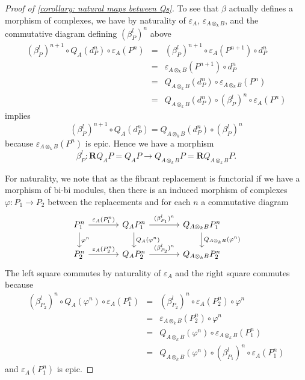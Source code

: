 \begin{proof}[Proof of {\ref{corollary: natural maps between Qs}}]
  To see that \(\beta\) actually defines a morphism of complexes, we have by naturality of \(\varepsilon_A\), \(\varepsilon_{A \otimes_k B}\), and the commutative diagram defining \((\beta^l_P)^n\) above 
  \begin{eqnarray*}
    (\beta^l_P)^{n+1} \circ Q_{A}(d^n_{P}) \circ \varepsilon_{A}(P^n)
    &=& (\beta^l_P)^{n+1} \circ \varepsilon_{A}(P^{n+1}) \circ d^n_{P}\\
    &=& \varepsilon_{A \otimes_k B}(P^{n+1}) \circ d^n_{P}\\
    &=& Q_{A \otimes_k B}(d_{P}^n) \circ \varepsilon_{A \otimes_k B}(P^n)\\
    &=& Q_{A \otimes_k B}(d_{P}^n) \circ (\beta^l_P)^n \circ \varepsilon_{A}(P^n)
  \end{eqnarray*}
  implies
  \[(\beta^l_P)^{n+1} \circ Q_{A}(d^n_{P}) = Q_{A \otimes_k B}(d^n_{P}) \circ (\beta^l_P)^n\]
  because \(\varepsilon_{A \otimes_k B}(P^n)\) is epic. Hence we have a morphism
  \[\beta^l_P \colon \mathbf{R}Q_{A} P = Q_{A} P \to Q_{A \otimes_k B} P = \mathbf{R}Q_{A \otimes_k B} P.\]

  For naturality, we note that as the fibrant replacement is functorial if we have a morphism of bi-bi modules, then there is an induced morphism of complexes \(\varphi \colon P_1 \to P_2\) between the replacements and for each \(n\) a commutative diagram 
  \[\begin{tikzcd}[column sep=large]
  P_1^n \arrow{d}{\varphi^n}\arrow{r}{\varepsilon_{A}(P_1^n)} & Q_{A} P_1^n\arrow{d}{Q_{A}(\varphi^n)} \arrow{r}{(\beta^l_{P_1})^n} & Q_{A \otimes_k B}P_1^n \arrow{d}{Q_{A \otimes_k B}(\varphi^n)}\\
  P_2^n \arrow{r}{\varepsilon_{A}(P_2^n)} & Q_{A} P_2^n \arrow{r}{(\beta^l_{P_2})^n} & Q_{A \otimes_k B} P_2^n
  \end{tikzcd}\]  The left square commutes by naturality of \(\varepsilon_{A}\) and the right square commutes because
  \begin{eqnarray*}
    (\beta^l_{P_2})^n \circ Q_{A}(\varphi^n) \circ \varepsilon_{A}(P_1^n)
    &=& (\beta^l_{P_2})^n \circ \varepsilon_{A}(P_2^n) \circ \varphi^n\\
    &=&  \varepsilon_{A \otimes_k B}(P_2^n) \circ \varphi^n\\
    &=& Q_{A \otimes_k B}(\varphi^n) \circ \varepsilon_{A \otimes_k B}(P_1^n)\\
    &=& Q_{A \otimes_k B}(\varphi^n) \circ (\beta^l_{P_1})^n \circ \varepsilon_{A}(P_1^n)
  \end{eqnarray*}
  and \(\varepsilon_{A}(P_1^n)\) is epic.
\end{proof}


